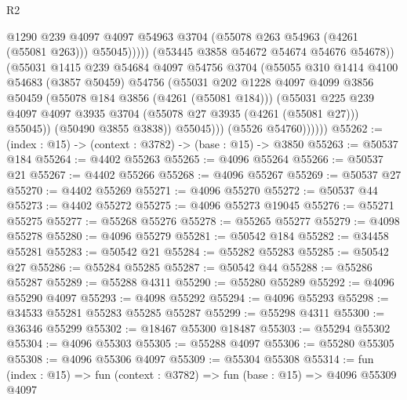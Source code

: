 \begin{lexlean}{R2}
\begin{coremodule}
                              @1290
                              @239
                              @4097
                              @4097
                              @54963
                              @3704
                              (@55078 @263 @54963 (@4261 (@55081 @263)))
                              @55045)))))
                    (@53445 @3858 @54672 @54674 @54676 @54678))
                  (@55031
                    @1415
                    @239
                    @54684
                    @4097
                    @54756
                    @3704
                    (@55055
                      @310
                      @1414
                      @4100
                      @54683
                      (@3857 @50459)
                      @54756
                      (@55031
                        @202
                        @1228
                        @4097
                        @4099
                        @3856
                        @50459
                        (@55078 @184 @3856 (@4261 (@55081 @184)))
                        (@55031
                          @225
                          @239
                          @4097
                          @4097
                          @3935
                          @3704
                          (@55078 @27 @3935 (@4261 (@55081 @27)))
                          @55045))
                      (@50490 @3855 @3838))
                    @55045)))
              (@5526 @54760))))))
@55262 := (index : @15) -> (context : @3782) -> (base : @15) -> @3850
@55263 := @50537 @184
@55264 := @4402 @55263
@55265 := @4096 @55264
@55266 := @50537 @21
@55267 := @4402 @55266
@55268 := @4096 @55267
@55269 := @50537 @27
@55270 := @4402 @55269
@55271 := @4096 @55270
@55272 := @50537 @44
@55273 := @4402 @55272
@55275 := @4096 @55273 @19045
@55276 := @55271 @55275
@55277 := @55268 @55276
@55278 := @55265 @55277
@55279 := @4098 @55278
@55280 := @4096 @55279
@55281 := @50542 @184
@55282 := @34458 @55281
@55283 := @50542 @21
@55284 := @55282 @55283
@55285 := @50542 @27
@55286 := @55284 @55285
@55287 := @50542 @44
@55288 := @55286 @55287
@55289 := @55288 @4311
@55290 := @55280 @55289
@55292 := @4096 @55290 @4097
@55293 := @4098 @55292
@55294 := @4096 @55293
@55298 := @34533 @55281 @55283 @55285 @55287
@55299 := @55298 @4311
@55300 := @36346 @55299
@55302 := @18467 @55300 @18487
@55303 := @55294 @55302
@55304 := @4096 @55303
@55305 := @55288 @4097
@55306 := @55280 @55305
@55308 := @4096 @55306 @4097
@55309 := @55304 @55308
@55314 := fun (index : @15) => fun (context : @3782) => fun (base : @15) => @4096 @55309 @4097

\end{coremodule}
\end{lexlean}
